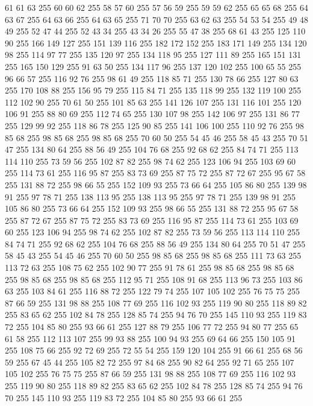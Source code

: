 61 61 63 255 60 60 62 255 58 57 60 255 57 56 59 255 59 59 62 255 65 65 68 255 64 63 67 255 64 63 66 255 64 63 65 255 71 70 70 255 63 62 63 255 54 53 54 255 49 48 49 255 52 47 44 255 52 43 34 255 43 34 26 255 55 47 38 255 68 61 43 255 125 110 90 255 166 149 127 255 151 139 116 255 182 172 152 255 183 171 149 255 134 120 98 255 114 97 77 255 135 120 97 255 134 118 95 255 127 111 89 255 165 151 131 255 165 150 129 255 91 63 50 255 134 117 96 255 137 120 102 255 100 65 55 255 96 66 57 255 116 92 76 255 98 61 49 255 118 85 71 255 130 78 66 255 127 80 63 255 170 108 88 255 156 95 79 255 115 84 71 255 135 118 99 255 132 119 100 255 112 102 90 255 70 61 50 255 101 85 63 255 141 126 107 255 131 116 101 255 120 106 91 255 88 80 69 255 112 74 65 255 130 107 98 255 142 106 97 255 131 86 77 255 129 99 92 255 118 86 78 255 125 90 85 255 141 106 100 255 110 92 76 255 98 85 68 255 98 85 68 255 98 85 68 255
70 60 50 255 54 45 46 255 58 45 43 255 70 51 47 255 134 80 64 255 88 56 49 255 104 76 68 255 92 68 62 255 84 74 71 255 113 114 110 255 73 59 56 255 102 87 82 255 98 74 62 255 123 106 94 255 103 69 60 255 114 73 61 255 116 95 87 255 83 73 69 255 87 75 72 255 87 72 67 255 95 67 58 255 131 88 72 255 98 66 55 255 152 109 93 255 73 66 64 255 105 86 80 255 139 98 91 255 97 78 71 255 138 113 95 255 138 113 95 255 97 78 71 255 139 98 91 255 105 86 80 255 73 66 64 255 152 109 93 255 98 66 55 255 131 88 72 255 95 67 58 255 87 72 67 255 87 75 72 255 83 73 69 255 116 95 87 255 114 73 61 255 103 69 60 255 123 106 94 255 98 74 62 255 102 87 82 255 73 59 56 255 113 114 110 255 84 74 71 255 92 68 62 255 104 76 68 255 88 56 49 255 134 80 64 255 70 51 47 255 58 45 43 255 54 45 46 255 70 60 50 255 98 85 68 255 98 85 68 255 111 73 63 255 113 72 63 255 108 75 62 255 102 90 77 255
91 78 61 255 98 85 68 255 98 85 68 255 98 85 68 255 98 85 68 255 112 95 71 255 108 91 68 255 113 96 73 255 103 86 63 255 103 84 61 255 116 88 72 255 122 79 74 255 107 105 102 255 76 75 75 255 87 66 59 255 131 98 88 255 108 77 69 255 116 102 93 255 119 90 80 255 118 89 82 255 83 65 62 255 102 84 78 255 128 85 74 255 94 76 70 255 145 110 93 255 119 83 72 255 104 85 80 255 93 66 61 255 127 88 79 255 106 77 72 255 94 80 77 255 65 61 58 255 112 113 107 255 99 93 88 255 100 94 93 255 69 64 66 255 150 105 91 255 108 75 66 255 92 72 69 255 72 55 54 255 159 120 104 255 91 66 61 255 68 56 59 255 67 45 44 255 105 82 72 255 97 84 68 255 90 82 64 255 92 71 65 255 107 105 102 255 76 75 75 255 87 66 59 255 131 98 88 255 108 77 69 255 116 102 93 255 119 90 80 255 118 89 82 255 83 65 62 255 102 84 78 255 128 85 74 255 94 76 70 255 145 110 93 255 119 83 72 255 104 85 80 255 93 66 61 255
